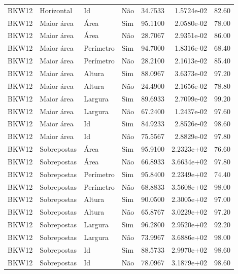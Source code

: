 \begin{tabular}{llllrrr}
BKW12     & Horizontal  & Id        & Não         & 34.7533      & 1.5724e-02 & 82.60    \\
BKW12     & Maior área  & Área      & Sim         & 95.1100      & 2.0580e-02 & 78.00    \\
BKW12     & Maior área  & Área      & Não         & 28.7067      & 2.9351e-02 & 86.00    \\
BKW12     & Maior área  & Perímetro & Sim         & 94.7000      & 1.8316e-02 & 68.40    \\
BKW12     & Maior área  & Perímetro & Não         & 28.2100      & 2.1613e-02 & 85.40    \\
BKW12     & Maior área  & Altura    & Sim         & 88.0967      & 3.6373e-02 & 97.20    \\
BKW12     & Maior área  & Altura    & Não         & 24.4900      & 2.1656e-02 & 78.80    \\
BKW12     & Maior área  & Largura   & Sim         & 89.6933      & 2.7099e-02 & 99.20    \\
BKW12     & Maior área  & Largura   & Não         & 67.2400      & 1.2437e-02 & 97.60    \\
BKW12     & Maior área  & Id        & Sim         & 84.9233      & 2.8526e-02 & 98.60    \\
BKW12     & Maior área  & Id        & Não         & 75.5567      & 2.8829e-02 & 97.80    \\
BKW12     & Sobrepostas & Área      & Sim         & 95.9100      & 2.2323e+02 & 76.60    \\
BKW12     & Sobrepostas & Área      & Não         & 66.8933      & 3.6634e+02 & 97.80    \\
BKW12     & Sobrepostas & Perímetro & Sim         & 95.8400      & 2.2349e+02 & 74.40    \\
BKW12     & Sobrepostas & Perímetro & Não         & 68.8833      & 3.5608e+02 & 98.00    \\
BKW12     & Sobrepostas & Altura    & Sim         & 90.0500      & 2.3005e+02 & 97.00    \\
BKW12     & Sobrepostas & Altura    & Não         & 65.8767      & 3.0229e+02 & 97.20    \\
BKW12     & Sobrepostas & Largura   & Sim         & 96.2800      & 2.9520e+02 & 92.20    \\
BKW12     & Sobrepostas & Largura   & Não         & 73.9967      & 3.6886e+02 & 98.00    \\
BKW12     & Sobrepostas & Id        & Sim         & 88.5733      & 2.9970e+02 & 98.60    \\
BKW12     & Sobrepostas & Id        & Não         & 78.0967      & 3.1879e+02 & 98.60    \\
\hline
\end{tabular}